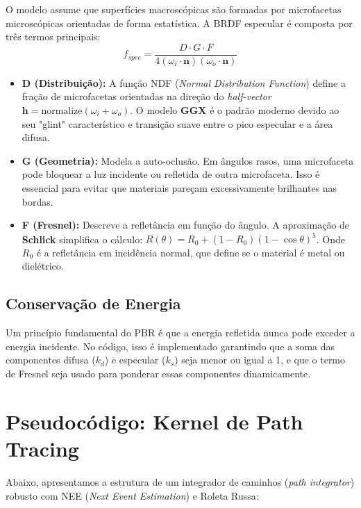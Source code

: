 O modelo assume que superfícies macroscópicas são formadas por microfacetas microscópicas orientadas de forma estatística. A BRDF especular é composta por três termos principais:
\begin{equation}
    f_{spec} = \frac{D \cdot G \cdot F}{4(\omega_i \cdot \mathbf{n})(\omega_o \cdot \mathbf{n})}
\end{equation}

\begin{itemize}
    \item \textbf{D (Distribuição):} A função NDF (\textit{Normal Distribution Function}) define a fração de microfacetas orientadas na direção do \textit{half-vector} $\mathbf{h} = \text{normalize}(\omega_i + \omega_o)$. O modelo \textbf{GGX} é o padrão moderno devido ao seu "glint" característico e transição suave entre o pico especular e a área difusa.
    \item \textbf{G (Geometria):} Modela a auto-oclusão. Em ângulos rasos, uma microfaceta pode bloquear a luz incidente ou refletida de outra microfaceta. Isso é essencial para evitar que materiais pareçam excessivamente brilhantes nas bordas.
    \item \textbf{F (Fresnel):} Descreve a refletância em função do ângulo. A aproximação de \textbf{Schlick} simplifica o cálculo: $R(\theta) = R_0 + (1 - R_0)(1 - \cos \theta)^5$. Onde $R_0$ é a refletância em incidência normal, que define se o material é metal ou dielétrico.
\end{itemize}

\subsection{Conservação de Energia}

Um princípio fundamental do PBR é que a energia refletida nunca pode exceder a energia incidente. No código, isso é implementado garantindo que a soma das componentes difusa ($k_d$) e especular ($k_s$) seja menor ou igual a 1, e que o termo de Fresnel seja usado para ponderar essas componentes dinamicamente.

\section{Pseudocódigo: Kernel de Path Tracing}

Abaixo, apresentamos a estrutura de um integrador de caminhos (\textit{path integrator}) robusto com NEE (\textit{Next Event Estimation}) e Roleta Russa:

